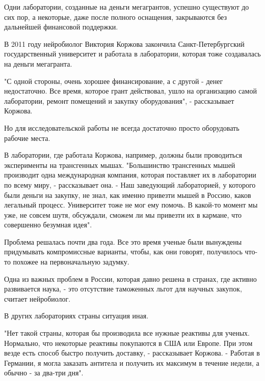 Одни лаборатории, созданные на деньги мегагрантов, успешно существуют до сих пор, а некоторые, даже после полного оснащения, закрываются без дальнейшей финансовой поддержки.

В 2011 году нейробиолог Виктория Коржова закончила Санкт-Петербургский государственный университет и работала в лаборатории, которая тоже создавалась на деньги мегагранта.


"С одной стороны, очень хорошее финансирование, а с другой - денег недостаточно. Все время, которое грант действовал, ушло на организацию самой лаборатории, ремонт помещений и закупку оборудования", - рассказывает Коржова.

Но для исследовательской работы не всегда достаточно просто оборудовать рабочие места.

В лаборатории, где работала Коржова, например, должны были проводиться эксперименты на трансгенных мышах. "Большинство трансгенных мышей производит одна международная компания, которая поставляет их в лаборатории по всему миру, - рассказывает она. - Наш заведующий лабораторией, у которого были деньги на закупку, не знал, как именно привезти мышей в Россию, каков легальный процесс. Университет тоже не мог ему помочь. В какой-то момент мы уже, не совсем шутя, обсуждали, сможем ли мы привезти их в кармане, что совершенно безумная идея".

Проблема решалась почти два года. Все это время ученые были вынуждены придумывать компромиссные варианты, чтобы, как они говорят, получилось что-то похожее на первоначальную задумку.

Одна из важных проблем в России, которая давно решена в странах, где активно развивается наука, - это отсутствие таможенных льгот для научных закупок, считает нейробиолог.


В других лабораториях страны ситуация иная.

"Нет такой страны, которая бы производила все нужные реактивы для ученых. Нормально, что некоторые реактивы покупаются в США или Европе. При этом везде есть способ быстро получить доставку, - рассказывает Коржова. - Работая в Германии, я могла заказать антитела и получить их максимум в течение недели, а обычно - за два-три дня".

